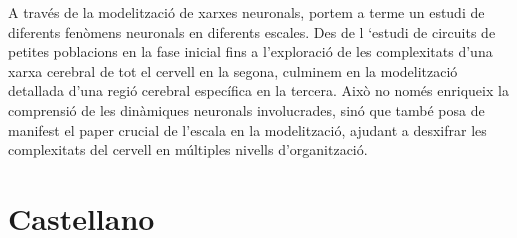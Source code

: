 \documentclass[../main.tex]{subfiles}
\begin{document}
\begin{otherlanguage}{catalan}
A través de la modelització de xarxes neuronals, portem a terme un estudi de diferents fenòmens neuronals en diferents escales. Des de l ‘estudi de circuits de petites poblacions en la fase inicial fins a l'exploració de les complexitats d'una xarxa cerebral de tot el cervell en la segona, culminem en la modelització detallada d'una regió cerebral específica en la tercera.
Això no només enriqueix la comprensió de les dinàmiques neuronals involucrades, sinó que també posa de manifest el paper crucial de l'escala en la modelització, ajudant a desxifrar les complexitats del cervell en múltiples nivells d'organització.
\end{otherlanguage}

\section*{Castellano}
\end{document}
